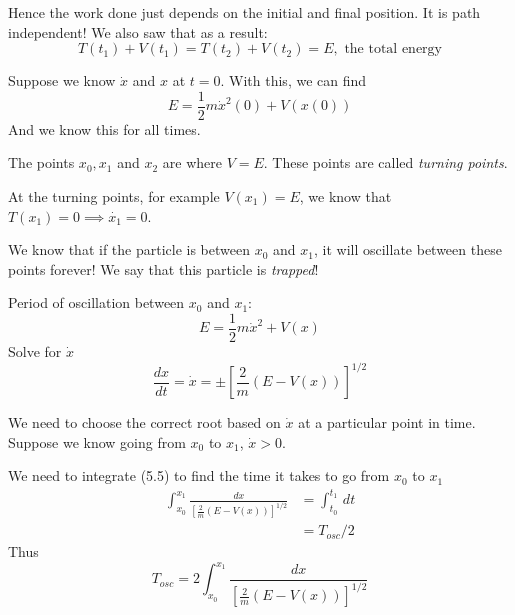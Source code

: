 \documentclass[twoside]{scrartcl}
\begin{document}
Hence the work done just depends on the initial and final position. It is path independent! We also saw that as a result:
\[T(t_1) + V(t_1) = T(t_2) + V(t_2) = E, \text{ the total energy}\]



\begin{center}
\end{center}



Suppose we know $\dot{x}$ and $x$ at $t = 0$. With this, we can find
\[E = \frac{1}{2}m\dot{x}^2(0) + V(x(0))\]
And we know this for all times.~\\

\begin{definition} The points $x_0,x_1$ and $x_2$ are where $V = E$. These points are called \emph{turning points}.
	
\end{definition}
At the turning points, for example $V(x_1) = E$, we know that $T(x_1) = 0 \implies \dot{x_1} = 0$. 

We know that if the particle is between $x_0$ and $x_1$, it will oscillate between these points forever! We say that this particle is \emph{trapped}!

Period of oscillation between $x_0$ and $x_1$:
\[E = \frac{1}{2}m\dot{x}^2 + V(x)\]
Solve for $\dot{x}$
\begin{equation}\frac{dx}{dt} = \dot{x} = \pm\left[\frac{2}{m}(E-V(x))\right]^{1/2}\end{equation}

We need to choose the correct root based on $\dot{x}$ at a particular point in time. Suppose we know going from $x_0$ to $x_1$, $\dot{x} >0$. 

We need to integrate (5.5) to find the time it takes to go from $x_0$ to $x_1$
\[\begin{aligned}\int_{x_0}^{x_1}\frac{dx}{\left[\frac{2}{m}(E-V(x))\right]^{1/2}} &= \int_{t_0}^{t_1} \,dt\\
&= T_{osc}/2	
\end{aligned}
 \]
 Thus
 \begin{equation}
 T_{osc} = 2\int_{x_0}^{x_1}\frac{dx}{\left[\frac{2}{m}(E-V(x))\right]^{1/2}}
\end{equation}
	
\end{document}
